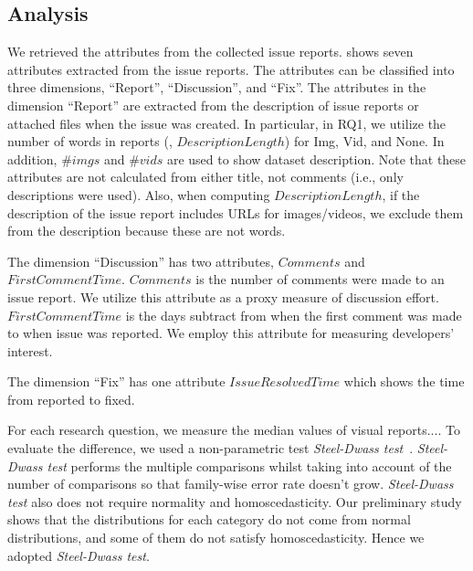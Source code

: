 \subsection{Analysis}
We retrieved the attributes from the collected issue reports.
 shows seven attributes extracted from 
the issue reports. 
The attributes can be classified into three dimensions, 
``Report'', ``Discussion'', and ``Fix''. 
The attributes in the dimension ``Report'' are extracted from 
the description of issue reports or attached files 
when the issue was created. 
In particular, in RQ1, we 
utilize the number of words 
in reports (\ie, $DescriptionLength$) for Img, Vid, and None. 
In addition,  $\#imgs$ and $\#vids$ are used to show 
dataset description. 
Note that these attributes are not calculated from either title, not comments (i.e., only descriptions were used). 
Also, when computing $DescriptionLength$, if the description of the issue report 
includes URLs for images/videos, 
we exclude them from the description because these are not words.

The dimension ``Discussion'' has two attributes, $Comments$ and $FirstCommentTime$. $Comments$ is the number of comments were made to an issue report. We utilize this attribute as a proxy measure of discussion effort. $FirstCommentTime$ is the days subtract from when the first comment was made to when issue was reported. We employ this attribute for measuring developers' interest. 

The dimension ``Fix'' has one attribute $IssueResolvedTime$ which shows the time from reported to fixed. 


For each research question, we measure the median values of visual reports.... 
To evaluate the difference, we used a non-parametric test \textit{Steel-Dwass test}~\citep{steel-dwass-test}.
\textit{Steel-Dwass test} performs the multiple comparisons whilst taking into account of the number of comparisons so that family-wise error rate doesn't grow.
\textit{Steel-Dwass test} also does not require normality and homoscedasticity.
Our preliminary study shows that the distributions for each category do not come from normal distributions, and some of them do not satisfy homoscedasticity. 
Hence we adopted \textit{Steel-Dwass test}.
